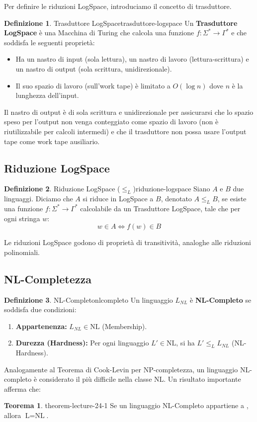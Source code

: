 \documentclass[a4paper]{article}
\theoremstyle{definition} %
\newtheorem{theorem}{Teorema}
[section]
\newtheorem{definition}{Definizione}[section]
\begin{document}
Per definire le riduzioni LogSpace, introduciamo il concetto di trasduttore.

\begin{definition}{Trasduttore LogSpace}{trasduttore-logspace}
Un \textbf{Trasduttore LogSpace} è una Macchina di Turing che calcola una funzione $f: \Sigma^* \to \Gamma^*$ e che soddisfa le seguenti proprietà:
\begin{itemize}
    \item Ha un nastro di input (sola lettura), un nastro di lavoro (lettura-scrittura) e un nastro di output (sola scrittura, unidirezionale).
    \item Il suo spazio di lavoro (sull'work tape) è limitato a $O(\log n)$ dove $n$ è la lunghezza dell'input.
\end{itemize}
\end{definition}
Il nastro di output è di sola scrittura e unidirezionale per assicurarsi che lo spazio speso per l'output non venga conteggiato come spazio di lavoro (non è riutilizzabile per calcoli intermedi) e che il trasduttore non possa usare l'output tape come work tape ausiliario.

\subsection{Riduzione LogSpace}

\begin{definition}{Riduzione LogSpace ($\le_L$)}{riduzione-logspace}
Siano $A$ e $B$ due linguaggi. Diciamo che $A$ si riduce in LogSpace a $B$, denotato $A \le_L B$, se esiste una funzione $f: \Sigma^* \to \Gamma^*$ calcolabile da un Trasduttore LogSpace, tale che per ogni stringa $w$:
\[ w \in A \iff f(w) \in B \]
\end{definition}
Le riduzioni LogSpace godono di proprietà di transitività, analoghe alle riduzioni polinomiali.

\subsection{NL-Completezza}

\begin{definition}{NL-Completo}{nlcompleto}
Un linguaggio $L_{NL}$ è \textbf{NL-Completo} se soddisfa due condizioni:
\begin{enumerate}
    \item \textbf{Appartenenza:} $L_{NL} \in \text{NL}$ (Membership).
    \item \textbf{Durezza (Hardness):} Per ogni linguaggio $L' \in \text{NL}$, si ha $L' \le_L L_{NL}$ (NL-Hardness).
\end{enumerate}
\end{definition}
Analogamente al Teorema di Cook-Levin per NP-completezza, un linguaggio NL-completo è considerato il più difficile nella classe NL. Un risultato importante afferma che:
\begin{theorem}{}{{ theorem-lecture-24-1 }}
Se un linguaggio NL-Completo appartiene a , allora $\text{L} = \text{NL}$.
\end{theorem}
\end{document}
